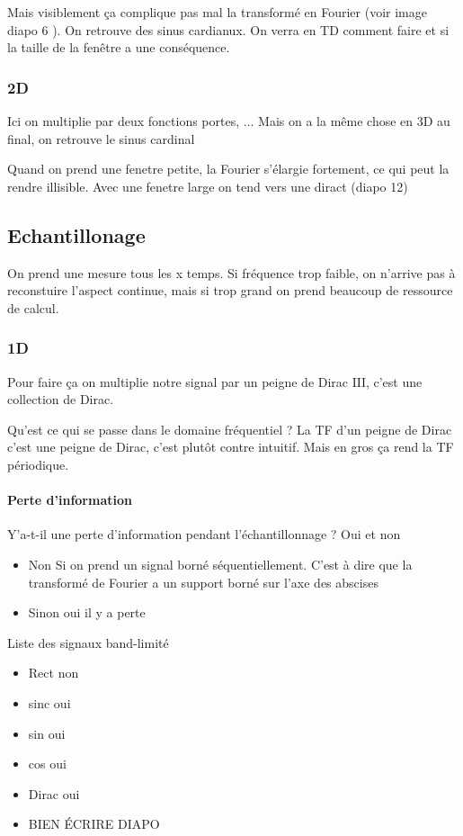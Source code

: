\documentclass{article}
\theoremstyle{plain}%
\theoremstyle{definition}
\theoremstyle{remark}
\begin{document}
Mais visiblement ça complique pas mal la transformé en Fourier (voir image diapo 6 ). On retrouve des sinus cardianux. On verra en TD comment faire et si la taille de la fenêtre a une conséquence.

\subsubsection{2D}
Ici on multiplie par deux fonctions portes, ...
Mais on a la même chose en 3D au final, on retrouve le sinus cardinal 

Quand on prend une fenetre petite, la Fourier s'élargie fortement, ce qui peut la rendre illisible. Avec une fenetre large on tend vers une diract (diapo 12)

\subsection{Echantillonage}
On prend une mesure tous les x temps. Si fréquence trop faible, on n'arrive pas à reconstuire l'aspect continue, mais si trop grand on prend beaucoup de ressource de calcul.

\subsubsection{1D}
Pour faire ça on multiplie notre signal par un peigne de Dirac $ \mathrm{III} $, c'est une collection de Dirac. 

Qu'est ce qui se passe dans le domaine fréquentiel ? La TF d'un peigne de Dirac c'est une peigne de Dirac, c'est plutôt contre intuitif. Mais en gros ça rend la TF périodique. 

\paragraph*{Perte d'information}
Y'a-t-il une perte d'information pendant l'échantillonnage ? Oui et non \begin{itemize}
    \item Non Si on prend un signal borné séquentiellement. C'est à dire que la transformé de Fourier a un support borné sur l'axe des abscises
    \item Sinon oui il y a perte
\end{itemize}
Liste des signaux band-limité \begin{itemize}
    \item Rect non
    \item sinc oui
    \item sin oui 
    \item cos oui 
    \item Dirac oui 
    \item BIEN ÉCRIRE DIAPO
\end{itemize}
\end{document}
